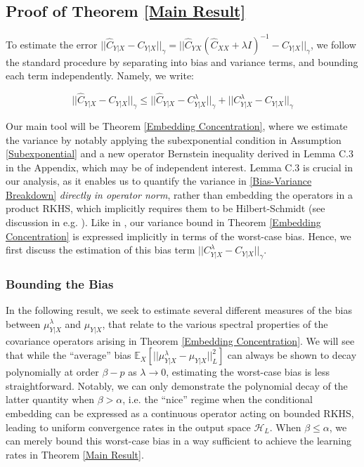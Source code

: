 \documentclass[accepted]{article}
\theoremstyle{definition}
\begin{document}
\subsection{Proof of Theorem \ref{Main Result}}
\label{Theorem 4 Proof}
To estimate the error $||\hat{C}_{Y|X}  - C_{Y | X}||_{\gamma} = ||\hat{C}_{YX}(\hat{C}_{XX} + \lambda I)^{-1}  - C_{Y | X}||_{\gamma}$, we follow the standard procedure by separating into bias and variance terms, and bounding each term independently. Namely, we write:
\begin{small}
\begin{equation}
\label{Bias-Variance Breakdown}
    ||\hat{C}_{Y|X}  - C_{Y | X}||_{\gamma} \leq ||\hat{C}_{Y|X}  - C^{\lambda}_{Y|X}||_{\gamma} + ||C^{\lambda}_{Y|X} - C_{Y | X}||_{\gamma} 
\end{equation}
\end{small}

Our main tool will be Theorem \ref{Embedding Concentration}, where we estimate the variance by notably applying the subexponential condition in Assumption \ref{Subexponential} and a new operator Bernstein inequality derived in Lemma C.3 in the Appendix, which may be of independent interest. Lemma C.3 is crucial in our analysis, as it enables us to quantify the variance in \eqref{Bias-Variance Breakdown} \textit{directly in operator norm}, rather than embedding the operators in a product RKHS, which implicitly requires them to be Hilbert-Schmidt (see discussion in e.g. \cite{park2020measure, mollenhauer2020nonparametric}). Like in \cite{fischer2020sobolev}, our variance bound in Theorem \ref{Embedding Concentration} is expressed implicitly in terms of the worst-case bias. Hence, we first discuss the estimation of this bias term $||C^{\lambda}_{Y|X} - C_{Y | X}||_{\gamma}$. 

\subsubsection{Bounding the Bias}
\label{Bounding the Bias}
\par In the following result, we seek to estimate several different measures of the bias between $\mu^{\lambda}_{Y|X}$ and $\mu_{Y|X}$, that relate to the various spectral properties of the covariance operators arising in Theorem \ref{Embedding Concentration}. We will see that while the ``average'' bias $\mathbb{E}_{X}[||\mu^{\lambda}_{Y|X} - \mu_{Y|X}||^2_{L}]$ can always be shown to decay polynomially at order $\beta - p$ as $\lambda \to 0$, estimating the worst-case bias is less straightforward. Notably, we can only demonstrate the polynomial decay of the latter quantity when $\beta > \alpha$, i.e. the ``nice'' regime when the conditional embedding can be expressed as a continuous operator acting on bounded RKHS, leading to uniform convergence rates in the output space $\mathcal{H}_L$. When $\beta \leq \alpha$, we can merely bound this worst-case bias in a way sufficient to achieve the learning rates in Theorem \ref{Main Result}. 
\end{document}
